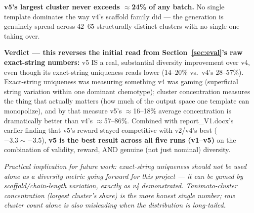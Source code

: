 \documentclass[11pt]{article}
\newcommand{\note}[1]{{\itshape\color{notegray}#1\par}}
\begin{document}
\textbf{v5's largest cluster never exceeds $\approx$24\% of any batch.} No single template dominates the way v4's scaffold family did --- the generation is genuinely spread across $42$--$65$ structurally distinct clusters with no single one taking over.

\textbf{Verdict --- this reverses the initial read from Section~\ref{sec:eval}'s raw exact-string numbers:} v5 IS a real, substantial diversity improvement over v4, even though its exact-string uniqueness reads lower ($14$--$20\%$ vs.\ v4's $28$--$57\%$). Exact-string uniqueness was measuring something v4 was gaming (superficial string variation within one dominant chemotype); cluster concentration measures the thing that actually matters (how much of the output space one template can monopolize), and by that measure v5's $\approx$16--18\% average concentration is dramatically better than v4's $\approx$57--86\%. Combined with report\_V1.docx's earlier finding that v5's reward stayed competitive with v2/v4's best ($-3.3 \sim -3.5$), \textbf{v5 is the best result across all five runs (v1--v5)} on the combination of validity, reward, AND genuine (not just nominal) diversity.

\note{Practical implication for future work: exact-string uniqueness should not be used alone as a diversity metric going forward for this project --- it can be gamed by scaffold/chain-length variation, exactly as v4 demonstrated. Tanimoto-cluster concentration (largest cluster's share) is the more honest single number; raw cluster count alone is also misleading when the distribution is long-tailed.}
\end{document}
